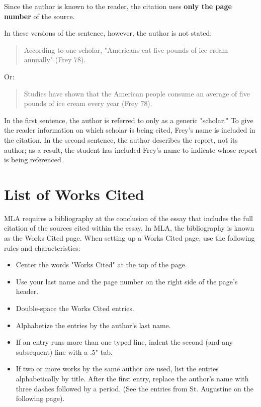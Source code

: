 Since the author is known to the reader, the citation uses \textbf{only the page 
number} of the source.

In these versions of the sentence, however, the author is not stated:

\begin{quote}
According to one scholar, "Americans eat five pounds of ice cream annually" (Frey 78).
\end{quote}
Or:

\begin{quote}
Studies have shown that the American people consume an average of five pounds of ice 
cream every year (Frey 78).
\end{quote}
In the first sentence, the author is referred to only as a generic "scholar." To give the 
reader information on which scholar is being cited, Frey's name is included in the 
citation. In the second sentence, the author describes the report, not its author; as a 
result, the student has included Frey's name to indicate whose report is being referenced. 


\section{List of Works Cited}

MLA requires a bibliography at the conclusion of the essay that includes the full 
citation of the sources cited within the essay. In MLA, the bibliography is known as the 
Works Cited page. When setting up a Works Cited page, use the following rules and 
characteristics:

\begin{itemize}
\item Center the words "Works Cited" at the top of the page.
\item Use your last name and the page number on the right side of the page's header.
\item Double-space the Works Cited entries.
\item Alphabetize the entries by the author's last name.
\item If an entry runs more than one typed line, indent the second (and any 
subsequent) line with a .5" tab.
\item If two or more works by the same author are used, list the entries alphabetically 
by title. After the first entry, replace the author's name with three dashes followed by a 
period. (See the entries from St. Augustine on the following page).
\end{itemize}


